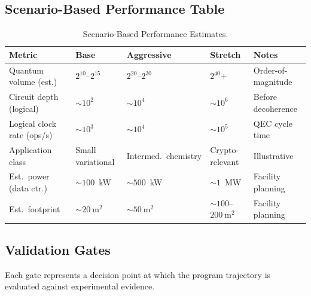 \documentclass[conference]{IEEEtran}
\begin{document}
\subsection{Scenario-Based Performance Table}

\begin{table}[htbp]
\centering
\caption{Scenario-Based Performance Estimates.}
\label{tab:performance}
\begin{tabular}{llllp{3cm}}
\toprule
\textbf{Metric} & \textbf{Base} & \textbf{Aggressive} & \textbf{Stretch} & \textbf{Notes} \\
\midrule
Quantum volume (est.) & $2^{10}$--$2^{15}$ & $2^{20}$--$2^{30}$ & $2^{40}$+ & Order-of-magnitude \\
Circuit depth (logical) & ${\sim}10^2$ & ${\sim}10^4$ & ${\sim}10^6$ & Before decoherence \\
Logical clock rate (ops/s) & ${\sim}10^3$ & ${\sim}10^4$ & ${\sim}10^5$ & QEC cycle time \\
Application class & Small variational & Intermed.\ chemistry & Crypto-relevant & Illustrative \\
Est.\ power (data ctr.) & ${\sim}100$~kW & ${\sim}500$~kW & ${\sim}1$~MW & Facility planning \\
Est.\ footprint & ${\sim}20~\text{m}^2$ & ${\sim}50~\text{m}^2$ & ${\sim}100$--$200~\text{m}^2$ & Facility planning \\
\bottomrule
\end{tabular}
\end{table}

\subsection{Validation Gates}

Each gate represents a decision point at which the program trajectory is evaluated against experimental evidence.
\end{document}
